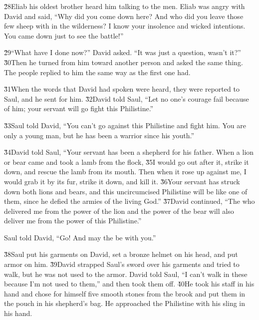 \v{28}Eliab his oldest brother heard him talking to the men. Eliab was angry with David and said, ``Why did you come down here? And who did you leave those few sheep with in the wilderness? I know your insolence and wicked intentions. You came down just to see the battle!''

\v{29}``What have I done now?'' David asked. ``It was just a question, wasn't it?'' \v{30}Then he turned from him toward another person and asked the same thing. The people replied to him the same way as the first one had.

\v{31}When the words that David had spoken were heard, they were reported to Saul, and he sent for him. \v{32}David told Saul, ``Let no one's courage fail because of him; your servant will go fight this Philistine.''

\v{33}Saul told David, ``You can't go against this Philistine and fight him. You are only a young man, but he has been a warrior since his youth.''

\v{34}David told Saul, ``Your servant has been a shepherd for his father. When a lion or bear came and took a lamb from the flock, \v{35}I would go out after it, strike it down, and rescue the lamb from its mouth. Then when it rose up against me, I would grab it by its fur, strike it down, and kill it. \v{36}Your servant has struck down both lions and bears, and this uncircumcised Philistine will be like one of them, since he defied the armies of the living God.'' \v{37}David continued, ``The  who delivered me from the power of the lion and the power of the bear will also deliver me from the power of this Philistine.''

Saul told David, ``Go! And may the  be with you.''

\v{38}Saul put his garments on David, set a bronze helmet on his head, and put armor on him. \v{39}David strapped Saul's sword over his garments and tried to walk, but he was not used to the armor. David told Saul, ``I can't walk in these because I'm not used to them,'' and then took them off. \v{40}He took his staff in his hand and chose for himself five smooth stones from the brook and put them in the pouch in his shepherd's bag. He approached the Philistine with his sling in his hand.

